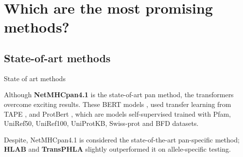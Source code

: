 \documentclass[10pt]{beamer}
\newcommand{\1}{
	\setbeamertemplate{background}{
		\texttt{[image: img/1]}
		\tikz[overlay] \fill[fill opacity=0.75,fill=white] (0,0) rectangle (-\paperwidth,\paperheight);
	}
}
\begin{document}
\section{ Which are the most promising methods?}

\subsection{ State-of-art methods}

\begin{frame}{State of art methods}{}
	
	\begin{block}{}
		Although \textbf{NetMHCpan4.1} is the state-of-art pan method, the transformers overcome exciting results. These BERT models \cite{cheng2021bertmhc,gasser2021interpreting,wang2022mhcroberta}, used transfer learning from TAPE \cite{rao2019evaluating}, and ProtBert \cite{elnaggar2021prottrans}, which are models self-supervised trained with Pfam, UniRef50, UniRef100, UniProtKB, Swiss-prot and BFD datasets. 
	\end{block}
	
	\begin{block}{}
		Despite, NetMHCpan4.1 \cite{reynisson2020netmhcpan} is considered the state-of-the-art pan-specific method; \textbf{HLAB}  \cite{zhang2022hlab} and \textbf{TransPHLA} \cite{chu2022transformer}  slightly outperformed it on allele-specific testing. 
	\end{block}
	
\end{frame}
\end{document}
